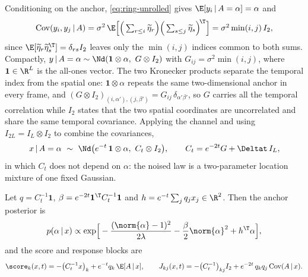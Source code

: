 Conditioning on the anchor, \eqref{eq:ring-unrolled} gives
$\E[y_i \,|\, A = \alpha] = \alpha$ and
\begin{equation}
  \mathrm{Cov}(y_i, y_j \,|\, A)
  = \sigma^2\, \E\Big[\Big(\textstyle\sum_{r \le i}\widetilde\eta_r\Big)
      \Big(\textstyle\sum_{s \le j}\widetilde\eta_s\Big)^{\!\T}\Big]
  = \sigma^2 \min(i,j)\, I_2 ,
  \label{eq:ring-K}
\end{equation}
since $\E[\widetilde\eta_r \widetilde\eta_s^{\T}] = \delta_{rs} I_2$ leaves only
the $\min(i,j)$ indices common to both sums. Compactly,
$y \,|\, A = \alpha \sim \Nd(\mathbf{1} \otimes \alpha,\ G \otimes I_2)$
with $G_{ij} = \sigma^2\min(i,j)$, where $\mathbf 1 \in \R^L$ is the
all-ones vector. The two Kronecker products separate the temporal index from
the spatial one: $\mathbf 1 \otimes \alpha$ repeats the same two-dimensional
anchor in every frame, and
$(G \otimes I_2)_{(i,\alpha'),(j,\beta')}
= G_{ij}\,\delta_{\alpha'\beta'}$, so $G$ carries all the temporal
correlation while $I_2$ states that the two spatial coordinates are
uncorrelated and share the same temporal covariance. Applying the channel and
using $I_{2L} = I_L \otimes I_2$ to combine the covariances,
\begin{equation}
  x \,|\, A = \alpha
  \ \sim\ \Nd\big(e^{-t}\,\mathbf 1 \otimes \alpha,\ C_t \otimes I_2\big),
  \qquad
  C_t = e^{-2t}G + \Deltat\, I_L ,
  \label{eq:ring-Ct}
\end{equation}
in which $C_t$ does not depend on $\alpha$: the noised law is a two-parameter
location mixture of one fixed Gaussian.

\begin{proposition}\label{prop:ring-exact}
Let $q = C_t^{-1}\mathbf 1$, $\beta = e^{-2t}\mathbf 1^{\T} C_t^{-1}\mathbf 1$
and $h = e^{-t}\sum_j q_j x_j \in \R^2$. Then the anchor posterior is
\begin{equation}
  p(\alpha \,|\, x) \propto
  \exp\!\Big[ -\frac{(\norm{\alpha}-1)^2}{2\lambda}
              - \frac{\beta}{2}\norm{\alpha}^2 + h^{\T}\alpha \Big] ,
  \label{eq:ring-anchor-posterior}
\end{equation}
and the score and response blocks are
\begin{equation}
  \score_k(x,t) = -\big(C_t^{-1}x\big)_k + e^{-t} q_k\, \E[A \,|\, x] ,
  \qquad
  J_{kj}(x,t) = -\big(C_t^{-1}\big)_{kj} I_2
                + e^{-2t}\, q_k q_j\, \mathrm{Cov}(A \,|\, x) .
  \label{eq:ring-surrogate-score}
\end{equation}
\end{proposition}

